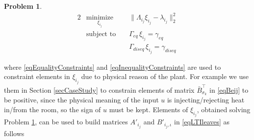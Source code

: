 \documentclass[letterpaper, 10 pt, conference]{ifacconf}  %
\newtheorem{problem}{Problem}
\begin{document}
\begin{problem}\label{pbLeastSquareProblem}
\small
\begin{alignat}{2}
\nonumber & \underset{\xi_{i_j}}{\text{minimize}} & &  \parallel \Lambda_{i_j} \xi_{i_j}  - \lambda_{i_j} \parallel_2^2            \\
		  & \text{subject to }                    & &  \Gamma_{eq}    \, \xi_{i_j} = \gamma_{eq}\label{eqEqualityConstraints}      \\
		  &                                       & &  \Gamma_{diseq} \, \xi_{i_j} = \gamma_{diseq}\label{eqInequalityConstraints}
\end{alignat}
\normalsize
\end{problem}

where \eqref{eqEqualityConstraints} and \eqref{eqInequalityConstraints} are used to constraint elements in $\xi_{i_j}$ due to physical reason of the plant. For example we use them in Section \ref{secCaseStudy} to constrain elements of matrix $\bar B_{\sigma_k}^\top$ in \eqref{eqBeij} to be positive, since the physical meaning of the input $u$ is injecting/rejecting heat in/from the room, so the sign of $u$ must be kept. Elements of $\xi_{i_j}$, obtained solving Problem \ref{pbLeastSquareProblem}, can be used to build matrices $A'_{i_j}$ and $B'_{i_j,\iota}$ in \eqref{eqLTIleaves} as follows
\end{document}
